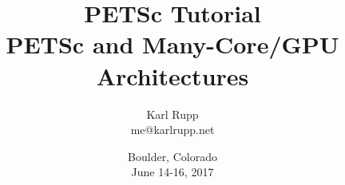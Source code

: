\documentclass[usepdftitle=false,9pt]{beamer}
\author[Karl Rupp]{Karl Rupp \\ \ttfamily me@karlrupp.net}
\institute[Freelance]
{ \footnotesize
  Freelance Computational Scientist \\
  \textit{and} \\
  Institute for Microelectronics, TU Wien
}
\title[PETSc]{ { { \Huge PETSc Tutorial } \\ PETSc and Many-Core/GPU Architectures } %
             }
\date[PETSc 2017, June 14-16, 2017]{ \footnotesize Boulder, Colorado \\[1em] June 14-16, 2017}
\begin{document}
\begin{frame}[plain]
 \frametitle{~}
 \titlepage
\end{frame}


\end{document}
